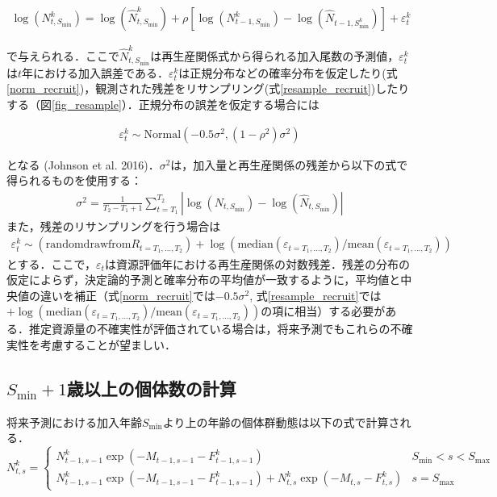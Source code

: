 \documentclass[11pt]{jsarticle}
\begin{document}
\begin{eqnarray}
  \log (N_{t,S_{\mathrm{min}}}^k ) = \log (\hat{N}_{t,S_{\mathrm{min}}}^k)+\rho [ \log (N_{t-1,S_{\mathrm{min}}}^k) - \log(\hat{N}_{t-1,S_{\mathrm{min}}^k}) ] + \varepsilon_t^k
\end{eqnarray}

で与えられる．ここで$\hat{N}_{t,S_{\mathrm{min}}}^k$は再生産関係式から得られる加入尾数の予測値，$\varepsilon_t^k$は$t$年における加入誤差である．$\varepsilon_t^k$は正規分布などの確率分布を仮定したり(式\ref{norm_recruit})，観測された残差をリサンプリング(式\ref{resample_recruit})したりする（図\ref{fig_resample}）．正規分布の誤差を仮定する場合には

\begin{eqnarray}
  \varepsilon_t^k \sim \mathrm{Normal} (-0.5\sigma^2,(1-\rho^2 ) \sigma^2 )
  \label{norm_recruit}
\end{eqnarray}

となる (Johnson et al. 2016)．$\sigma^2$は，加入量と再生産関係の残差から以下の式で得られるものを使用する：
\begin{eqnarray}
  \sigma^2 = \frac{1}{T_2-T_{1}+1} \sum_{t=T_1}^{T_2} |\log (N_{t,S_{\mathrm{min}}}) -\log (\hat{N}_{t,S_{\mathrm{min}} } ) |
\end{eqnarray}
また，残差のリサンプリングを行う場合は
\begin{eqnarray}
  \varepsilon_t^k \sim (\mathrm{random} \mathrm{draw} \mathrm{from}  R_{t={T_1,…,T_2}} ) + \log (\mathrm{median} (\varepsilon_{t={T_1,…,T_2}})/\mathrm{mean} (\varepsilon_{t={T_1,...,T_2}}))
        \label{resample_recruit}
\end{eqnarray}
とする．ここで，$\varepsilon_t$は資源評価年における再生産関係の対数残差．残差の分布の仮定によらず，決定論的予測と確率分布の平均値が一致するように，平均値と中央値の違いを補正（式\ref{norm_recruit}では$-0.5\sigma^2$, 式\ref{resample_recruit}では $+\log (\mathrm{median} (\varepsilon_{t={T_1,…,T_2}})/\mathrm{mean} (\varepsilon_{t={T_1,...,T_2}}))$の項に相当）する必要がある．推定資源量の不確実性が評価されている場合は，将来予測でもこれらの不確実性を考慮することが望ましい\cite{ichinokawa}．

\subsection{$S_{\mathrm{min}}+1$歳以上の個体数の計算}
将来予測における加入年齢$S_{\mathrm{min}}$より上の年齢の個体群動態は以下の式で計算される．
\begin{equation}
  N_{t,s}^k = \begin{cases}
      N_{t-1, s-1}^k  \exp(-M_{t-1,s-1}-F_{t-1,s-1}^k )  &    S_\mathrm{min} < s < S_\mathrm{max} \\
      N_{t-1, s-1}^k  \exp(-M_{t-1,s-1}-F_{t-1,s-1}^k ) + N_{t, s}^k  \exp(-M_{t,s}-F_{t,s}^k) &   s=S_{\mathrm{max}}
  \end{cases}
  \label{future_eq}
\end{equation}
\end{document}

